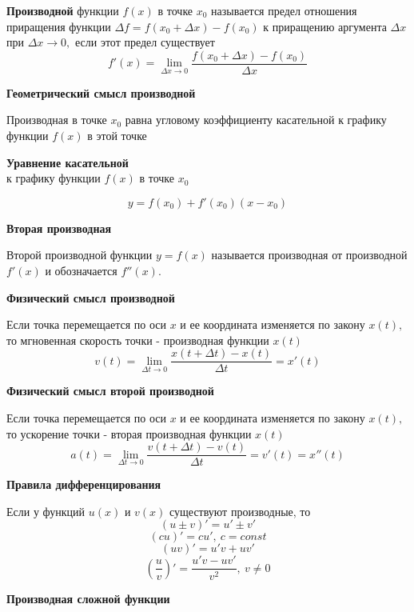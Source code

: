 \documentclass[a4paper, 14pt]{extarticle}
\begin{document}
{\textbf{Производной} функции $f(x)$  в точке $x_0$ называется  предел отношения приращения функции $\Delta f=f(x_0+\Delta x)-f(x_0)$ к приращению аргумента $\Delta x$ при $\Delta x\to 0,$ если этот предел существует
$$
f'(x)=\lim\limits_{\Delta x\to 0}\frac{f(x_0+\Delta x)-f(x_0)}{\Delta x}
$$

\begin{center}
\textbf{Геометрический смысл производной}
\end{center}
Производная в точке $x_0$ равна угловому коэффициенту касательной
к графику функции $f(x)$ в этой точке

\begin{center}
\textbf{Уравнение касательной}\\
к графику функции $f(x)$ в точке $x_0$
\end{center}
$$y=f(x_0)+f'(x_0)(x-x_0)$$

\begin{center}
\textbf{Вторая производная}
\end{center}

Второй производной функции $y=f(x)$ называется производная от производной $f'(x)$  и обозначается $f''(x).$

\begin{center}
\textbf{Физический смысл производной}
\end{center}
Если точка перемещается по оси $x$ и ее координата изменяется по закону $x(t),$ то мгновенная скорость точки - производная функции $x(t)$ 
$$
v(t)=\lim\limits_{\Delta t\to 0}\frac{x(t+\Delta t)-x(t)}{\Delta t}=x'(t)
$$

\begin{center}
\textbf{Физический смысл второй производной}
\end{center}
Если точка перемещается по оси $x$ и ее координата изменяется по закону $x(t),$ то ускорение точки - вторая производная функции $x(t)$ 
$$
a(t)=\lim\limits_{\Delta t\to 0}\frac{v(t+\Delta t)-v(t)}{\Delta t}=v'(t)=x''(t)
$$

\begin{center}
\textbf{Правила дифференцирования}
\end{center}

Если у функций $u(x)$ и $v(x)$ существуют производные, то
$$
(u\pm v)'=u'\pm v'
$$
$$
(cu)'=cu', \ c=const
$$
$$
(uv)'=u'v+uv'
$$
$$
\left(\frac{u}{v}\right)'=\frac{u'v-uv'}{v^2},\ v\not= 0
$$

\begin{center}
\textbf{Производная сложной функции}
\end{center}

}
\end{document}
